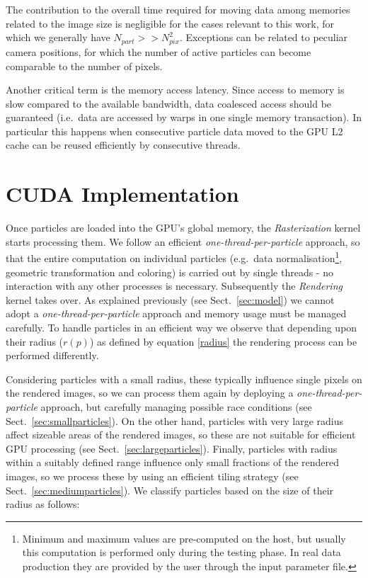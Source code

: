 \documentclass[preprint,5pt]{elsarticle}
\begin{document}
The contribution to the overall time required for moving data among memories related to the image size is negligible for the cases relevant to this work, 
for which we generally have $N_{part} >>  N_{pix}^2$. Exceptions can be related to peculiar camera positions, for which the number of  active particles can become comparable to the number of pixels. 

Another critical term is the memory access latency. 
Since access to memory is slow compared to
the available bandwidth, 
data coalesced access should be guaranteed (i.e.\ data are accessed by warps in one single memory transaction). In particular this happens when consecutive particle data moved to the GPU L2 cache can be reused efficiently by consecutive threads. 

\section{CUDA Implementation}
\label{sec:implementation}

Once particles are loaded into the GPU's global memory, the {\it Rasterization} kernel starts processing them. We follow an efficient {\it one-thread-per-particle} approach, so that the entire computation on individual particles (e.g.~data normalisation\footnote{Minimum and maximum values are pre-computed on the host, but usually this computation is performed only during the testing phase. In real data production they are provided by the user through the input parameter file.}, geometric transformation and coloring) is carried out by single threads - no interaction with any other processes is necessary. 
Subsequently the {\it Rendering} kernel takes over. As explained previously (see Sect.~\ref{sec:model}) we cannot adopt a {\it one-thread-per-particle} approach and memory usage must be managed carefully. To handle particles in an efficient way we observe that depending upon their radius ($r(p)$) as defined by equation \eqref{radius} the rendering process can be performed differently.

Considering particles with a small radius, these typically influence single pixels on the rendered images, so we can process them again by deploying a {\it one-thread-per-particle} approach, but carefully managing possible race conditions (see Sect.~\ref{sec:smallparticles}). On the other hand, particles with very large radius affect sizeable areas of the rendered images, so these are not suitable for efficient GPU processing (see Sect.~\ref{sec:largeparticles}). Finally, particles with radius within a suitably defined range influence only small fractions of the rendered images, so we process these by using an efficient tiling strategy (see Sect.~\ref{sec:mediumparticles}). We classify particles based on the size of their radius as follows:
\end{document}
